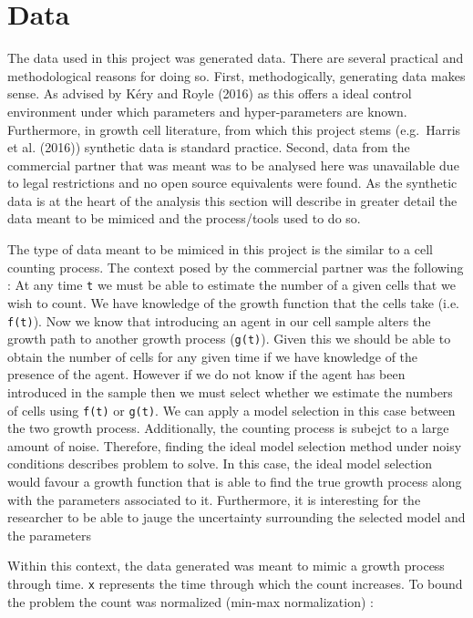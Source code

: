 \documentclass[]{article}
\begin{document}
\hypertarget{data}{%
\section{Data}\label{data}}

The data used in this project was generated data. There are several
practical and methodological reasons for doing so. First,
methodogically, generating data makes sense. As advised by Kéry and
Royle (2016) as this offers a ideal control environment under which
parameters and hyper-parameters are known. Furthermore, in growth cell
literature, from which this project stems (e.g.~Harris et al. (2016))
synthetic data is standard practice. Second, data from the commercial
partner that was meant was to be analysed here was unavailable due to
legal restrictions and no open source equivalents were found. As the
synthetic data is at the heart of the analysis this section will
describe in greater detail the data meant to be mimiced and the
process/tools used to do so.

The type of data meant to be mimiced in this project is the similar to a
cell counting process. The context posed by the commercial partner was
the following : At any time \texttt{t} we must be able to estimate the
number of a given cells that we wish to count. We have knowledge of the
growth function that the cells take (i.e. \texttt{f(t)}). Now we know
that introducing an agent in our cell sample alters the growth path to
another growth process (\texttt{g(t)}). Given this we should be able to
obtain the number of cells for any given time if we have knowledge of
the presence of the agent. However if we do not know if the agent has
been introduced in the sample then we must select whether we estimate
the numbers of cells using \texttt{f(t)} or \texttt{g(t)}. We can apply
a model selection in this case between the two growth process.
Additionally, the counting process is subejct to a large amount of
noise. Therefore, finding the ideal model selection method under noisy
conditions describes problem to solve. In this case, the ideal model
selection would favour a growth function that is able to find the true
growth process along with the parameters associated to it. Furthermore,
it is interesting for the researcher to be able to jauge the uncertainty
surrounding the selected model and the parameters

Within this context, the data generated was meant to mimic a growth
process through time. \texttt{x} represents the time through which the
count increases. To bound the problem the count was normalized (min-max
normalization) :
\end{document}
